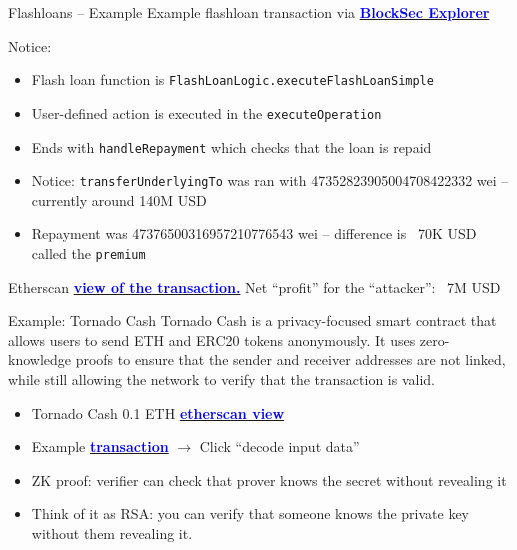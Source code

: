 \documentclass[aspectratio=169]{beamer}
\newcommand{\bluelink}[2]{\href{#1}{\textcolor{blue}{\textbf{#2}}}}
\begin{document}
\begin{frame}{Flashloans -- Example}
Example flashloan transaction via
\bluelink{https://app.blocksec.com/explorer/tx/eth/0xe3f0d14cfb6076cabdc9057001c3fafe28767a192e88005bc37bd7d385a1116a?line=5&debugLine=5}{BlockSec Explorer}
\bigskip

Notice:
\begin{itemize}
    \item Flash loan function is \texttt{FlashLoanLogic.executeFlashLoanSimple}
    \item User-defined action is executed in the \texttt{executeOperation}
    \item Ends with \texttt{handleRepayment} which checks that the loan is repaid
    \item Notice: \texttt{transferUnderlyingTo} was ran with 47352823905004708422332 wei -- currently around 140M USD
    \item Repayment was 47376500316957210776543 wei -- difference is ~70K USD called the \texttt{premium}
\end{itemize}
\smallskip

Etherscan
\bluelink{https://etherscan.io/tx/0xe3f0d14cfb6076cabdc9057001c3fafe28767a192e88005bc37bd7d385a1116a}{view of the transaction.}
Net ``profit'' for the ``attacker'': ~7M USD
\end{frame}

\begin{frame}{Example: Tornado Cash}
Tornado Cash is a privacy-focused smart contract that allows users to send
ETH and ERC20 tokens anonymously. It uses zero-knowledge proofs to ensure that
the sender and receiver addresses are not linked, while still allowing the
network to verify that the transaction is valid.
\begin{itemize}
    \item Tornado Cash 0.1
        ETH \bluelink{https://etherscan.io/address/0x12d66f87a04a9e220743712ce6d9bb1b5616b8fc}{etherscan view}
    \item Example
        \bluelink{https://etherscan.io/tx/0x6d503e39f3a5cfe3736963685d7c49823a8b9de114d74331f4f44b99426cf4d5}{transaction}
    $\rightarrow$ Click ``decode input data''

\item ZK proof: verifier can check that prover knows the secret without
    revealing it
\item Think of it as RSA: you can verify that someone knows the private key
    without them revealing it.
\end{itemize}
\end{frame}
\end{document}
